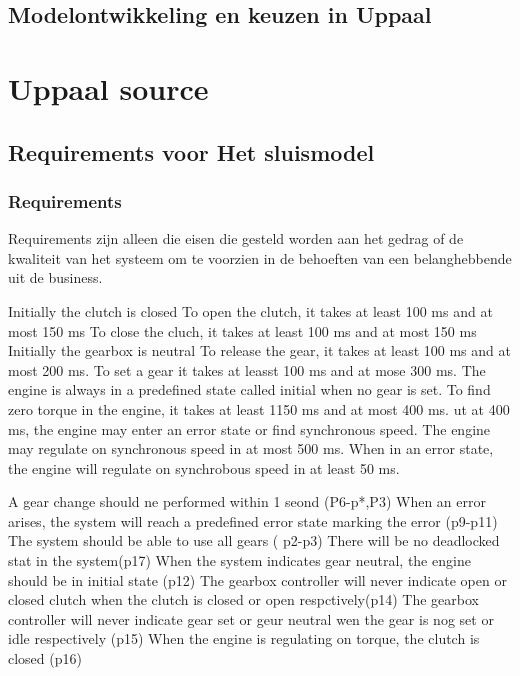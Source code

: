 \section{Modelontwikkeling en keuzen in Uppaal}
\chapter{Uppaal source}
\label{appendix}
\thispagestyle{myheadings}




\section{Requirements voor Het sluismodel}

 
\subsection{Requirements}
Requirements zijn alleen die eisen die gesteld worden aan het gedrag of de kwaliteit van het systeem om te voorzien in de behoeften van een belanghebbende uit de business.



Initially the clutch is closed
To open the clutch, it takes at least 100 ms and at most 150 ms
To close the cluch, it takes at least 100 ms and at most 150 ms
Initially the gearbox is neutral
To release the gear, it takes at least 100 ms and at most 200 ms.
To set a gear it takes at leasst 100 ms and at mose 300 ms.
The engine is always in a predefined state called initial when no gear is set.
To find zero torque in the engine, it takes at least 1150 ms and at most 400 ms. ut at 400 ms, the engine may enter an error state or find synchronous speed.
The  engine may regulate on synchronous speed in at most 500 ms.
When in an error state, the engine will regulate on synchrobous speed in at least 50 ms.


A gear change should ne performed within 1 seond (P6-p*,P3)
When an error arises, the system will reach a predefined error state marking the error (p9-p11)
The system should be able to use all gears ( p2-p3)
There will be no deadlocked stat in the system(p17)
When the system indicates gear neutral, the engine should  be in initial state (p12)
The gearbox controller will never indicate open or closed clutch when the clutch is closed or open respctively(p14)
The gearbox controller will never indicate gear set or geur neutral wen the gear is nog set or idle respectively (p15)
When the engine is regulating on torque, the clutch is closed (p16)



